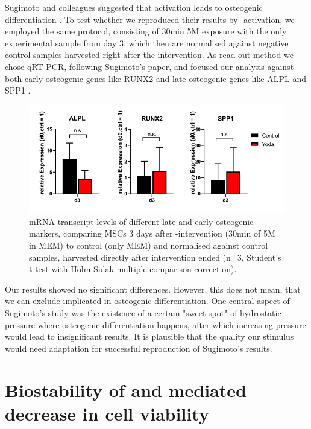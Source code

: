 Sugimoto and colleagues suggested that \Piezo{} activation leads to osteogenic differentiation \cite{Sugimoto2017}. To test whether we reproduced their results by \Piezo{}-activation, we employed the same protocol, consisting of 30min 5\textmu{}M \Yoda{} exposure with the only experimental sample from day 3, which then are normalised against negative control samples harvested right after the intervention. As read-out method we chose qRT-PCR, following Sugimoto's paper, and focused our analysis against both early osteogenic genes like RUNX2 and late osteogenic genes like ALPL and SPP1 \cite{Creecy2013, Marom2005}. \par


\begin{figure}[htbp]
	\centering
	\includegraphics[width = \linewidth]{Osteogenic_PCR_Yoda.png}
	\caption{mRNA transcript levels of different late and early osteogenic markers, comparing MSCs 3 days after \Yoda{}-intervention (30min of 5\mul{}M \Yoda{} in MEM\textalpha{}) to \Yoda{} control (only MEM\textalpha{}) and normalised against \Yoda{} control samples, harvested directly after intervention ended (n=3, Student's t-test with Holm-Sidak multiple comparison correction).}
	\label{fig:Osteo_PCR}
\end{figure}
 

Our results showed no significant differences. However, this does not mean, that we can exclude \Piezo{} implicated in osteogenic differentiation. One central aspect of Sugimoto's study was the existence of a certain "sweet-spot" of hydrostatic pressure where osteogenic differentiation happens, after which increasing pressure would lead to insignificant results. It is plausible that the quality our \Piezo{} stimulus would need adaptation for successful reproduction of Sugimoto's results.



\section{Biostability of \Yoda{} and \Piezo{} mediated decrease in cell viability}
\label{sec:biostability}


